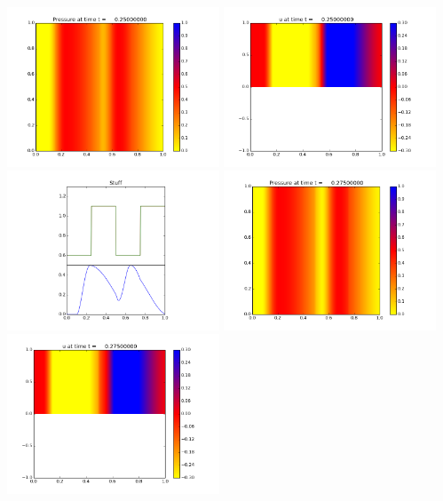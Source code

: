 \documentclass[11pt]{article}
\begin{document}
\vskip 10pt 
\includegraphics[width=0.475\textwidth]{frame0010fig0.png}
\includegraphics[width=0.475\textwidth]{frame0010fig1.png}
\vskip 10pt 
\includegraphics[width=0.475\textwidth]{frame0010fig3.png}
\vskip 10pt 
\includegraphics[width=0.475\textwidth]{frame0011fig0.png}
\includegraphics[width=0.475\textwidth]{frame0011fig1.png}
\end{document}

